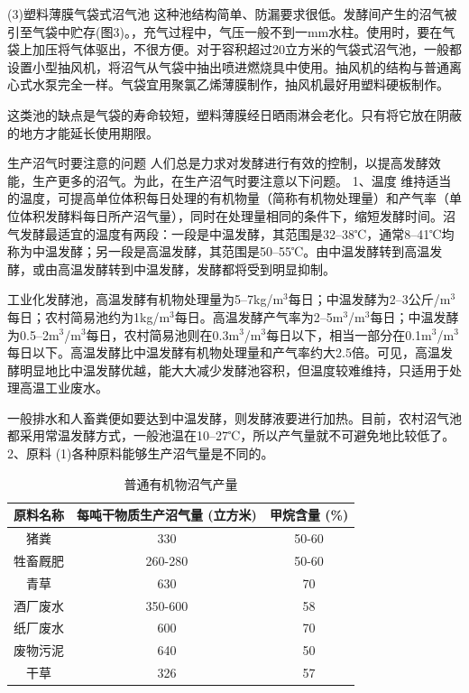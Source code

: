 \documentclass{ctexbook}
\begin{document}
(3)塑料薄膜气袋式沼气池
这种池结构简单、防漏要求很低。发酵间产生的沼气被引至气袋中贮存(图3)。，充气过程中，气压一般不到一mm水柱。使用时，要在气袋上加压将气体驱出，不很方便。对于容积超过20立方米的气袋式沼气池，一般都设置小型抽风机，将沼气从气袋中抽出喷进燃烧具中使用。抽风机的结构与普通离心式水泵完全一样。气袋宜用聚氯乙烯薄膜制作，抽风机最好用塑料硬板制作。

这类池的缺点是气袋的寿命较短，塑料薄膜经日晒雨淋会老化。只有将它放在阴蔽的地方才能延长使用期限。

生产沼气时要注意的问题
人们总是力求对发酵进行有效的控制，以提高发酵效能，生产更多的沼气。为此，在生产沼气时要注意以下问题。
1、温度	
维持适当的温度，可提高单位体积每日处理的有机物量（简称有机物处理量）和产气率（单位体积发酵料每日所产沼气量），同时在处理量相同的条件下，缩短发酵时间。沼气发酵最适宜的温度有两段：一段是中温发酵，其范围是32--38℃，通常8--41℃均称为中温发酵；另一段是高温发酵，其范围是50--55℃。由中温发酵转到高温发酵，或由高温发酵转到中温发酵，发酵都将受到明显抑制。

工业化发酵池，高温发酵有机物处理量为5--7kg/m$^3$每日；中温发酵为2--3公斤/m$^3$每日；农村简易池约为1kg/m$^3$每日。高温发酵产气率为2--5m$^3$/m$^3$每日；中温发酵为0.5--2m$^3$/m$^3$每日，农村简易池则在0.3m$^3$/m$^3$每日以下，相当一部分在0.1m$^3$/m$^3$每日以下。高温发酵比中温发酵有机物处理量和产气率约大2.5倍。可见，高温发酵明显地比中温发酵优越，能大大减少发酵池容积，但温度较难维持，只适用于处理高温工业废水。

一般排水和人畜粪便如要达到中温发酵，则发酵液要进行加热。目前，农村沼气池都采用常温发酵方式，一般池温在10--27℃，所以产气量就不可避免地比较低了。
2、原料
(1)各种原料能够生产沼气量是不同的。

\begin{table}[htbp]
	\centering
	\caption{普通有机物沼气产量}
	\begin{tabular}{c|c|c}
				\hline
		原料名称  & 每吨干物质生产沼气量 (立方米) & 甲烷含量 (\%) \\ \hline
		猪粪    & 330   & 50-60 \\ \hline
		牲畜厩肥  & 260-280 & 50-60 \\ \hline
		青草    & 630   & 70 \\ \hline
		酒厂废水  & 350-600 & 58 \\ \hline
		纸厂废水  & 600   & 70 \\ \hline
		废物污泥  & 640   & 50 \\ \hline
		干草    & 326   & 57 \\
				\hline
	\end{tabular}%
	\label{tab:zhaoqichanliang}%
\end{table}%
\end{document}
